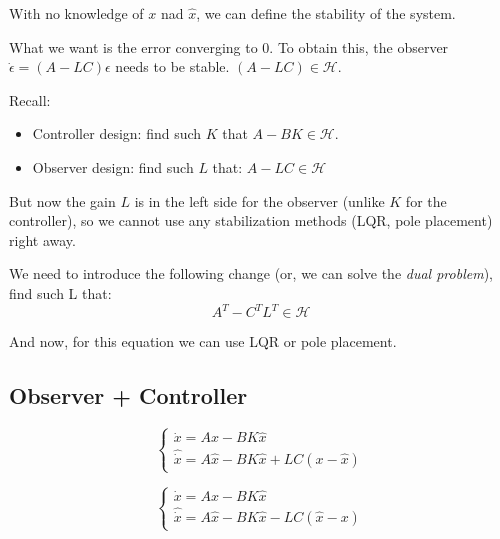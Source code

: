 With no knowledge of $x$ nad $\hat x$, we can define the stability of the system. 

What we want is the error converging to 0. To obtain this, the observer $\dot \epsilon = (A - LC) \epsilon$ needs to be stable. 
$(A-LC) \in \mathcal{H}$.

Recall:
\begin{itemize}
    \item Controller design: find such $K$ that $A-BK \in \mathcal{H}$.
    \item Observer design: find such $L$ that: $A-LC \in \mathcal{H}$
\end{itemize}

But now the gain $L$ is in the left side for the  observer (unlike $K$ for the controller), so we cannot use any stabilization methods
(LQR, pole placement) right away. 

We need to introduce the following change (or, we can solve the \textit{dual problem}), 
find such L that:
\[A^T - C^TL^T \in \mathcal{H}\]

And  now, for this equation we can use LQR or pole placement. 


\subsection{Observer + Controller}




\[
\begin{cases}
    \dot x = Ax - BK \hat x \\
    \hat{\dot {x}} = A \hat x - BK \hat x + LC(x - \hat x)
\end{cases}
\]


\begin{equation}
    \begin{cases}
        \dot x = Ax - BK \hat x \label{eq:state_eq1} \\
        \hat{\dot {x}} = A \hat x - BK \hat x - LC(\hat x - x) 
    \end{cases}
\end{equation}


